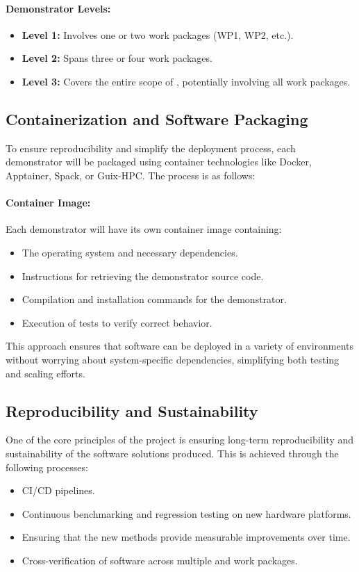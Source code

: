 \paragraph{Demonstrator Levels:}
\begin{itemize}
    \item \textbf{Level 1:} Involves one or two work packages (WP1, WP2, etc.).
    \item \textbf{Level 2:} Spans three or four work packages.
    \item \textbf{Level 3:} Covers the entire scope of \exama, potentially involving all work packages.
\end{itemize}

\subsection{Containerization and Software Packaging}
\label{sec:containerization}

To ensure reproducibility and simplify the deployment process, each demonstrator will be packaged using container technologies like Docker, Apptainer, Spack, or Guix-HPC. The process is as follows:

\paragraph{Container Image:}
Each demonstrator will have its own container image containing:
\begin{itemize}
    \item The operating system and necessary dependencies.
    \item Instructions for retrieving the demonstrator source code.
    \item Compilation and installation commands for the demonstrator.
    \item Execution of tests to verify correct behavior.
\end{itemize}

This approach ensures that software can be deployed in a variety of environments without worrying about system-specific dependencies, simplifying both testing and scaling efforts.

\subsection{Reproducibility and Sustainability}
\label{sec:reproducibility}

One of the core principles of the \exama project is ensuring long-term reproducibility and sustainability of the software solutions produced. This is achieved through the following processes:
\begin{itemize}
    \item CI/CD pipelines.
    \item Continuous benchmarking and regression testing on new hardware platforms.
    \item Ensuring that the new methods provide measurable improvements over time.
    \item Cross-verification of software across multiple \exama and \numpex work packages.
\end{itemize}

